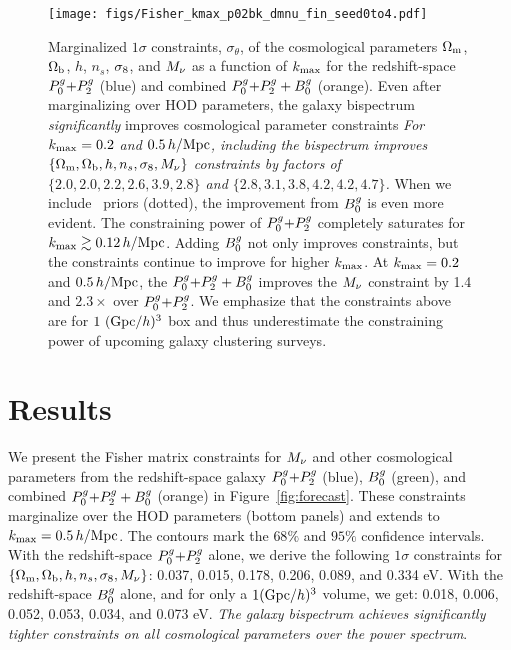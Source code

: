 \begin{figure}
    \begin{center}
        \texttt{[image: figs/Fisher\_kmax\_p02bk\_dmnu\_fin\_seed0to4.pdf]}
        \caption{Marginalized $1\sigma$ constraints, $\sigma_\theta$, of the
        cosmological parameters $\Omega_{\rm m}$, $\Omega_{\rm b}$, $h$, $n_s$, $\sigma_8$, and $M_\nu$
        as a function of $k_{\rm max}$ for the redshift-space $P^g_0{+}P^g_2$ (blue)
        and combined $P^g_0{+}P^g_2 + B^g_0$ (orange). Even after marginalizing over
        HOD parameters, the galaxy bispectrum {\em significantly} improves 
        cosmological parameter constraints%
        {\em For $k_{\rm max} = 0.2$ and $0.5\,h/\mathrm{Mpc}$, including the bispectrum
        improves $\{\Omega_{\rm m}, \Omega_{\rm b}, h, n_s, \sigma_8, M_\nu\}$ constraints by factors 
        of $\{2.0, 2.0, 2.2, 2.6, 3.9, 2.8\}$ and $\{2.8, 3.1, 3.8, 4.2, 4.2, 4.7\}$.} 
        When we include \planck~priors (dotted), the improvement from $B^g_0$ is even more
        evident. The constraining power of $P^g_0{+}P^g_2$ completely
        saturates for $k_{\rm max} \gtrsim 0.12\,h/\mathrm{Mpc}$. Adding $B^g_0$ not only 
        improves constraints, but the constraints continue to improve for
        higher $k_{\rm max}$. At $k_{\rm max} = 0.2$ and $0.5\,h/\mathrm{Mpc}$, the $P^g_0{+}P^g_2
        + B^g_0$ improves the $M_\nu$ constraint by 1.4 and $2.3\times$ over $P^g_0{+}P^g_2$. 
        We emphasize that the constraints above are for $1~({\rm Gpc}/h)^3$ box
        and thus underestimate the constraining power of upcoming galaxy
        clustering surveys.
        }
        \label{fig:kmax_forecast}
    \end{center}
\end{figure}

\section{Results} \label{sec:results} 
We present the Fisher matrix constraints for $M_\nu$ and other cosmological
parameters from the redshift-space galaxy $P^g_0{+}P^g_2$ (blue), $B^g_0$ (green), and 
combined $P^g_0{+}P^g_2 + B^g_0$ (orange) in Figure~\ref{fig:forecast}. These
constraints marginalize over the \cite{zheng2007} HOD parameters %
(bottom panels) and extends to $k_{\rm max} = 0.5\,h/\mathrm{Mpc}$. The contours mark the $68\%$ and
$95\%$ confidence intervals. With the redshift-space $P^g_0{+}P^g_2$
alone, we derive the following $1\sigma$ constraints for $\{\Omega_{\rm m}, \Omega_{\rm b}, h, n_s,
\sigma_8, M_\nu\}$: 
0.037, 0.015, 0.178, 0.206, 0.089, and 0.334 eV.
With the redshift-space $B^g_0$ alone, and for only a $1 ({\rm Gpc}/h)^3$ volume,
we get: 0.018, 0.006, 0.052, 0.053, 0.034, and 0.073 eV.
{\em The galaxy bispectrum achieves significantly tighter constraints on all
cosmological parameters over the power spectrum}. 

